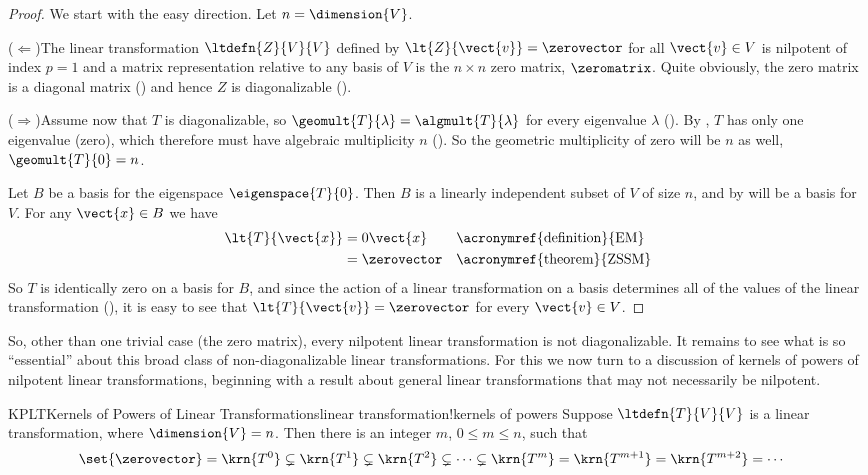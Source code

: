 \begin{proof}
We start with the easy direction.  Let $n=\dimension{V}$.\par
%
($\Leftarrow$)\quad The linear transformation $\ltdefn{Z}{V}{V}$ defined by $\lt{Z}{\vect{v}}=\zerovector$ for all $\vect{v}\in V$ is nilpotent of index $p=1$ and a matrix representation relative to any basis of $V$ is the $n\times n$ zero matrix, $\zeromatrix$.  Quite obviously, the zero matrix is a diagonal matrix () and hence $Z$ is diagonalizable ().\par
%
($\Rightarrow$)\quad Assume now that $T$ is diagonalizable, so $\geomult{T}{\lambda}=\algmult{T}{\lambda}$ for every eigenvalue $\lambda$ ().  By , $T$ has only one eigenvalue (zero), which therefore must have algebraic multiplicity $n$  ().  So the geometric multiplicity of zero will be $n$ as well, $\geomult{T}{0}=n$.\par
%
Let $B$ be a basis for the eigenspace $\eigenspace{T}{0}$.  Then $B$ is a linearly independent subset of $V$ of size $n$, and by  will be a basis for $V$.  For any $\vect{x}\in B$ we have
%
\begin{align*}
\lt{T}{\vect{x}}
&=0\vect{x}&&\text{\acronymref{definition}{EM}}\\
&=\zerovector&&\text{\acronymref{theorem}{ZSSM}}
\end{align*}
%
So $T$ is identically zero on a basis for $B$, and since the action of a linear transformation on a basis determines all of the values of the linear transformation (), it is easy to see that $\lt{T}{\vect{v}}=\zerovector$ for every $\vect{v}\in V$.
%
\end{proof}
%
So, other than one trivial case (the zero matrix), every nilpotent linear transformation is not diagonalizable.  It remains to see what is so ``essential'' about this broad class of non-diagonalizable linear transformations.  For this we now turn to a discussion of kernels of powers of nilpotent linear transformations, beginning with a result about general linear transformations that may not necessarily be nilpotent.
%
\begin{theorem}{KPLT}{Kernels of Powers of Linear Transformations}{linear transformation!kernels of powers}
Suppose $\ltdefn{T}{V}{V}$ is a linear transformation, where $\dimension{V}=n$.  Then there is an integer $m$, $0\leq m\leq n$, such that
%
\begin{align*}
\set{\zerovector}
&=\krn{T^0}
\subsetneq\krn{T^1}
\subsetneq\krn{T^2}
\subsetneq\cdots
\subsetneq\krn{T^m}
=\krn{T^{m+1}}
=\krn{T^{m+2}}
=\cdots
\end{align*}
%
\end{theorem}
